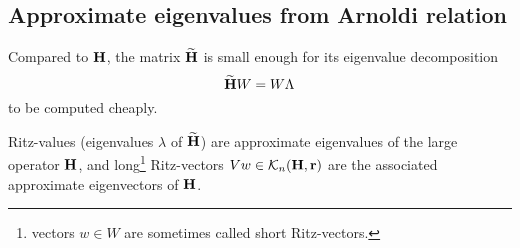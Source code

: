 \begin{comment}
\subsubsection{The remaining candidate-vector}
The last (n-th) candidate-vector $\vh_n = h_{n+1,n} v_{n+1}$ of algorithm~\ref{alg:arnoldi} is a notable quantity because it represents the error of the approximation $\H V \approx V \Himp$ (of $V$ to an invariant-subspace ).   One expects the sequence to decrease in general, since $\nrm{}{\vh_n}$ is zero for $n\geq d(\H,\Rr)\leq N$, but it is not monotonically decreasing.    From a model reduction standpoint, a satisfactory model can be obtained without having $n$ large enough to make $\nrm{}{\vh_n}$ small.   This is because $\nrm{}{\vh_n}$ represents the amount of new spectral information of $\H$ discovered on the $n$-th step, after previously discovered directions $v_j, j=1,2,...,n$ have been subtracted off.   A rapidly decreasing $\nrm{}{\vh_n}$ indicates that further iterations with $\H$ are not  producing much new spectral information.    Recall that eigenvalues of $\H$ correspond to poles of the transfer-function.   As long as new poles are being discovered (starting from $\sigma$ and moving outward), $\vh_n$ is rich with information.  The poles being discovered may or may not be significant in the sense of frequency response approximation, however.  
\end{comment}

 
\subsection{Approximate eigenvalues from Arnoldi relation} 
Compared to $\textbf{\textup{H}}$, the matrix $\widetilde{\textbf{\textup{H}}}$ is small enough for its eigenvalue decomposition 
\[
\widetilde{\textbf{\textup{H}}} W = W \Lambda
\]
to be computed cheaply.

 Ritz-values (eigenvalues $\lambda$ of $\widetilde{\textbf{\textup{H}}}$) are approximate eigenvalues of the large operator $\textbf{\textup{H}}$, and long\footnote{vectors $w\in W$ are sometimes called short Ritz-vectors.} Ritz-vectors $Vw\in\mathcal{K}_{n}({\textbf{\textup{H}}},{\textbf{\textup{r}}})$  are the associated approximate eigenvectors of $\textbf{\textup{H}}$. 

